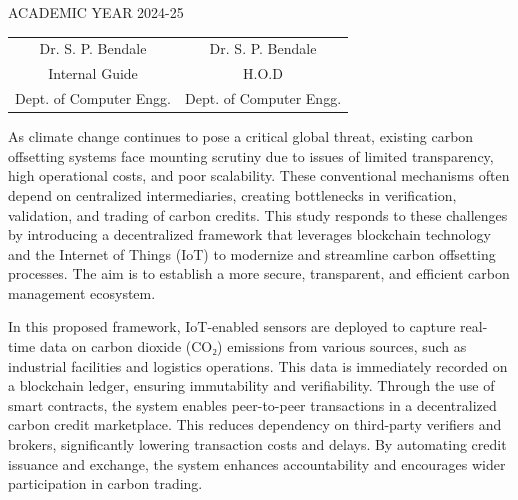 \documentclass[oneside,a4paper,12pt]{book}
\begin{document}
 \begin{center}
 ACADEMIC YEAR 2024-25
 \end{center}
 
 \vspace*{3\baselineskip}
 \begin{tabular}{c c }
Dr. S. P. Bendale &  \hspace{50 mm} Dr. S. P. Bendale \\								
Internal Guide   &  \hspace{50 mm} H.O.D \\
Dept. of Computer Engg.  &	\hspace{50 mm}Dept. of Computer Engg.  \\
\end{tabular}
\newpage

\setcounter{page}{0}
\frontmatter
{}
\rfoot{\thepage}

		
{   \setlength{\parindent}{11mm} }
{ \setlength{\parindent}{0mm} }
As climate change continues to pose a critical global threat, existing carbon offsetting systems face mounting scrutiny due to issues of limited transparency, high operational costs, and poor scalability. These conventional mechanisms often depend on centralized intermediaries, creating bottlenecks in verification, validation, and trading of carbon credits. This study responds to these challenges by introducing a decentralized framework that leverages blockchain technology and the Internet of Things (IoT) to modernize and streamline carbon offsetting processes. The aim is to establish a more secure, transparent, and efficient carbon management ecosystem.

In this proposed framework, IoT-enabled sensors are deployed to capture real-time data on carbon dioxide (CO₂) emissions from various sources, such as industrial facilities and logistics operations. This data is immediately recorded on a blockchain ledger, ensuring immutability and verifiability. Through the use of smart contracts, the system enables peer-to-peer transactions in a decentralized carbon credit marketplace. This reduces dependency on third-party verifiers and brokers, significantly lowering transaction costs and delays. By automating credit issuance and exchange, the system enhances accountability and encourages wider participation in carbon trading.
\end{document}
